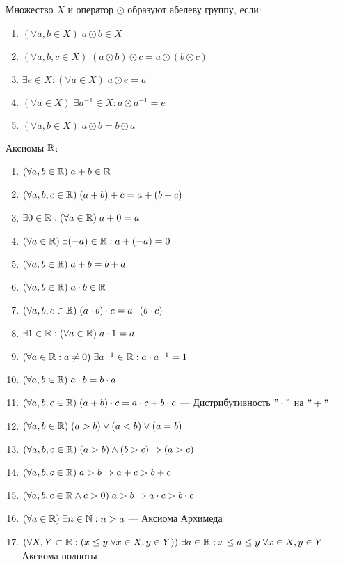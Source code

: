 \documentclass{article}
\begin{document}


Множество $X$ и оператор $\odot$ образуют абелеву группу, если:

\begin{enumerate}[label=\Roman*.]
	\item$(\forall a, b\in X)\;a\odot b\in X$
	\item$(\forall a,b,c\in X)\;(a\odot b)\odot c=a\odot(b\odot c)$
	\item$\exists e\in X:(\forall a\in X)\;a\odot e=a$
	\item$(\forall a\in X)\;\exists a^{-1}\in X:a\odot a^{-1}=e$
	\item$(\forall a, b\in X)\;a\odot b=b\odot a$
\end{enumerate}


Аксиомы $\mathbb{R}$:

\begin{enumerate}[label=\Roman*.]
	\item{}$(\forall a, b\in\mathbb{R})\;a+b\in\mathbb{R}$
	\item$(\forall a,b,c\in\mathbb{R})\;(a+b)+c=a+(b+c)$
	\item$\exists 0\in\mathbb{R}:(\forall a\in\mathbb{R})\;a+0=a$
	\item$(\forall a\in\mathbb{R})\;\exists (-a)\in\mathbb{R}:a+(-a)=0$
	\item{}$(\forall a, b\in\mathbb{R})\;a+b=b+a$
	\item{}$(\forall a, b\in \mathbb{R})\;a\cdot b\in \mathbb{R}$
	\item$(\forall a,b,c\in \mathbb{R})\;(a\cdot b)\cdot c=a\cdot(b\cdot c)$
	\item$\exists 1\in \mathbb{R}:(\forall a\in \mathbb{R})\;a\cdot 1=a$
	\item$(\forall a\in \mathbb{R}:a\neq 0)\;\exists a^{-1}\in \mathbb{R}:a\cdot a^{-1}=1$
	\item{}$(\forall a, b\in \mathbb{R})\;a\cdot b=b\cdot a$
	\item$(\forall a,b,c\in\mathbb{R})\;(a+b)\cdot c=a\cdot c+b\cdot c$ --- Дистрибутивность $"\cdot"$ на $"+"$
	\item{}$(\forall a,b\in\mathbb{R})\;(a>b)\lor (a<b)\lor (a=b)$
	\item$(\forall a,b,c\in\mathbb{R})\;(a>b)\land(b>c)\Rightarrow (a>c)$
	\item$(\forall a,b,c\in\mathbb{R})\;a>b\Rightarrow a+c>b+c$
	\item{}$(\forall a,b,c\in\mathbb{R} \land c>0)\;a>b\Rightarrow a\cdot c>b\cdot c$
	\item$(\forall a\in\mathbb{R})\;\exists n\in\mathbb{N}:n>a$ --- Аксиома Архимеда
	\item$(\forall X,Y\subset\mathbb{R}:(x\leq y\;\forall x\in X,y\in Y))\;
		\exists a\in\mathbb{R}: x\leq a\leq y\;\forall x\in X,y\in Y$ --- Аксиома полноты
\end{enumerate}
\end{document}
